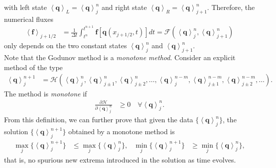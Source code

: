 with left state $\left\langle \mathbf{q}\right\rangle_{L} = \left\langle\mathbf{q}\right\rangle^{n}_j$ and
right state $\left\langle \mathbf{q} \right\rangle_{R} = \left\langle\mathbf{q}\right\rangle^{n}_{j+1}$.
Therefore, the numerical fluxes
\begin{align}
    \left\langle\mathbf{f}\right\rangle_{j+ 1/2} &= 
    \frac{1}{\Delta t} \int^{t^{n+1}}_{t^n} \mathbf{f} \left[\mathbf{q}\left(x_{j+ 1/2},t\right)\right] dt
    = \mathcal{F}\left( \left\langle\mathbf{q}\right\rangle^{n}_j, \left\langle\mathbf{q}\right\rangle^{n}_{j+1} \right)
\end{align}
only depends on the two constant states $\left\langle\mathbf{q}\right\rangle^{n}_j$ and $\left\langle\mathbf{q}\right\rangle^{n}_{j+1}$.\\
Note that the Godunov method is a \textit{monotone method}.
Consider an explicit method of the type
\begin{align}
    \left\langle \mathbf{q}\right\rangle^{n+1}_j &=
    \mathcal{H} \left(\left\langle \mathbf{q}\right\rangle^n_j, \left\langle \mathbf{q}\right\rangle^n_{j\pm 1},
    \left\langle \mathbf{q}\right\rangle^n_{j\pm 2}, \dots,
    \left\langle \mathbf{q}\right\rangle^{n-m}_j,\left\langle \mathbf{q}\right\rangle^{n-m}_{j\pm 1},
    \left\langle \mathbf{q}\right\rangle^{n-m}_{j\pm 2}, \dots \right).
\end{align}
The method is \textit{monotone} if
\begin{align}
    \frac{\partial \mathcal{H}}{\partial \left\langle \mathbf{q}\right\rangle^n_j } &\geq 0
    \quad \forall \left\langle \mathbf{q}\right\rangle^n_j.
\end{align}
From this definition, we can further prove that given the data $\{ \left\langle \mathbf{q}\right\rangle^n_j \}$,
the solution $\{ \left\langle \mathbf{q}\right\rangle^{n+1}_j \}$ obtained by a monotone method is
\begin{align}
    \max_{j} \{ \left\langle \mathbf{q}\right\rangle^{n+1}_j \} &\leq \max_{j} \{\left\langle \mathbf{q}\right\rangle^n_j \}, &
    \min_{j} \{ \left\langle \mathbf{q}\right\rangle^{n+1}_j \} &\geq \min_{j} \{\left\langle \mathbf{q}\right\rangle^n_j \},
\end{align}
that is, no spurious new extrema introduced in the solution as time evolves.

